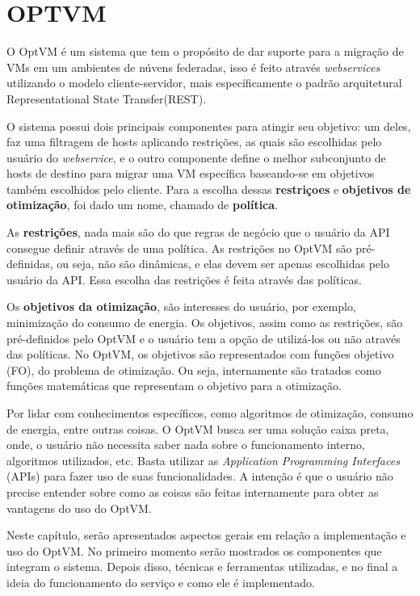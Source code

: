 \chapter{OPTVM}

O OptVM é um sistema que tem o propósito de dar suporte para a migração de VMs em um ambientes de núvens federadas,
isso é feito através \textit{webservices} utilizando o modelo cliente-servidor, mais específicamente o padrão arquitetural 
Representational State Transfer(REST).

O sistema possui dois principais componentes para atingir seu objetivo: um deles, faz uma filtragem de hosts aplicando restrições,
as quais são escolhidas pelo usuário do \textit{webservice}, e o 
outro componente define o melhor subconjunto de hosts de destino para migrar uma VM específica 
baseando-se em objetivos também escolhidos pelo cliente. 
Para a escolha dessas \textbf{restriçoes} e \textbf{objetivos de otimização}, foi dado um nome,
chamado de \textbf{política}. 

As \textbf{restrições}, nada mais são do que regras de negócio que o usuário da API consegue definir através de uma política.
As restrições no OptVM são pré-definidas, ou seja, não são dinâmicas, e elas devem ser apenas escolhidas pelo 
usuário da API. Essa escolha das restrições é feita através das políticas.

Os \textbf{objetivos da otimização}, são interesses do usuário, por exemplo, minimização do consumo de energia. Os objetivos,
assim como as restrições, são pré-definidos pelo OptVM e o usuário tem a opção de utilizá-los ou não através das políticas.
No OptVM, os objetivos são representados com funções objetivo (FO), do problema de otimização. Ou seja, internamente são tratados
como funções matemáticas que representam o objetivo para a otimização.

Por lidar com conhecimentos específicos, como algoritmos de otimização, consumo de energia, entre outras coisas. 
O OptVM busca ser uma solução caixa preta, onde, o usuário não necessita saber nada sobre o funcionamento interno, 
algoritmos utilizados, etc. Basta utilizar as \textit{Application Programming Interfaces} (APIs) para fazer uso de suas funcionalidades.
A intenção é que o usuário não precise entender sobre como as coisas são feitas internamente para obter as vantagens do uso do OptVM.

Neste capítulo, serão apresentados aspectos gerais em relação a implementação e uso do OptVM. 
No primeiro momento serão mostrados os componentes que integram o sistema. 
Depois disso, técnicas e ferramentas utilizadas, e no final a ideia do funcionamento do serviço e como ele é
implementado.

